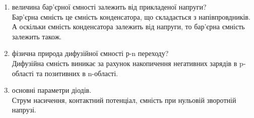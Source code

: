 \documentclass[12pt]{article}
\begin{document}
\begin{enumerate}
\begin{figure}[!ht]
    \end{figure}
    \item
        { величина бар'єрної ємності залежить від прикладеної напруги?}\\
    Бар'єрна ємність це ємність конденсатора, що складається з напівпровдників. А оскільки ємність конденсатора залежить від напруги, то бар'єрна ємність залежить також.
    \item
        { фізична природа дифузійної ємності р-n переходу?}\\
    Дифузійна ємність виникає за рахунок накопичення негативних зарядів в p-області та позитивних в n-області.
    \item
        { основні параметри діодів.}\\
    Струм насичення, контактний потенціал, ємність при нульовій зворотній напрузі.
\end{enumerate}
\end{document}
